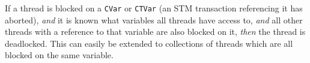 


If a thread is blocked on a \verb|CVar| or \verb|CTVar| (an STM
transaction referencing it has aborted), \emph{and} it is known what
variables all threads have access to, \emph{and} all other threads
with a reference to that variable are also blocked on it, \emph{then}
the thread is deadlocked. This can easily be extended to collections
of threads which are all blocked on the same variable.
